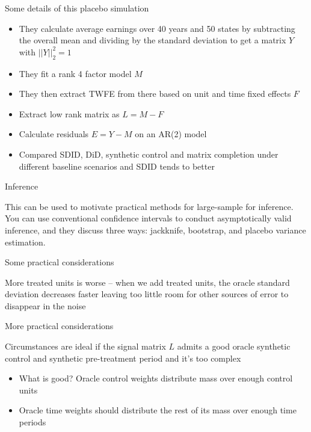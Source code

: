 \documentclass{beamer}
\begin{document}
\begin{frame}{Some details of this placebo simulation}

\begin{itemize}
\item They calculate average earnings over 40 years and 50 states by subtracting the overall mean and dividing by the standard deviation to get a matrix $Y$ with $||Y||^2_2 = 1$
\item They fit a rank 4 factor model $M$ 
\item They then extract TWFE from there based on unit and time fixed effects $F$
\item Extract low rank matrix as  $L=M-F$
\item Calculate residuals $E=Y-M$ on an AR(2) model
\item Compared SDID, DiD, synthetic control and matrix completion under different baseline scenarios and SDID tends to better

\end{itemize}

\end{frame}






\begin{frame}{Inference}


This can be used to motivate practical methods for large-sample for inference.  You can use conventional confidence intervals to conduct asymptotically valid inference, and they discuss three ways: jackknife, bootstrap, and placebo variance estimation.

\end{frame}






\begin{frame}{Some practical considerations}

More treated units is worse -- when we add treated units, the oracle standard deviation decreases faster leaving too little room for other sources of error to disappear in the noise

\end{frame}

\begin{frame}{More practical considerations}

Circumstances are ideal if the signal matrix $L$ admits a good oracle synthetic control and synthetic pre-treatment period and it's too complex

	\begin{itemize}
	\item What is good?  Oracle control weights distribute mass over enough control units
	\item Oracle time weights should distribute the rest of its mass over enough time periods
	\end{itemize}


\end{frame}
\end{document}
